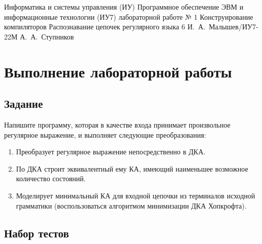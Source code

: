 \documentclass[a4paper]{bmstu}
\begin{document}
\makereporttitle
{Информатика и системы управления (ИУ)}
{Программное обеспечение ЭВМ и информационные технологии (ИУ7)}
{лабораторной работе № 1}
{Конструирование компиляторов}
{Распознавание цепочек регулярного языка}
{6}
{И.~А.~Малышев/ИУ7-22М}
{А.~А.~Ступников}


\setcounter{page}{2}


\chapter{Выполнение лабораторной работы}

\section{Задание}

Напишите программу, которая в качестве входа принимает произвольное регулярное выражение, и выполняет
следующие преобразования:
\begin{enumerate}
    \item Преобразует регулярное выражение непосредственно в ДКА.
    \item По ДКА строит эквивалентный ему КА, имеющий наименьшее возможное количество состояний.
    \item Моделирует минимальный КА для входной цепочки из терминалов исходной грамматики (воспользоваться алгоритмом минимизации ДКА Хопкрофта).
\end{enumerate}

\section{Набор тестов}
\end{document}
